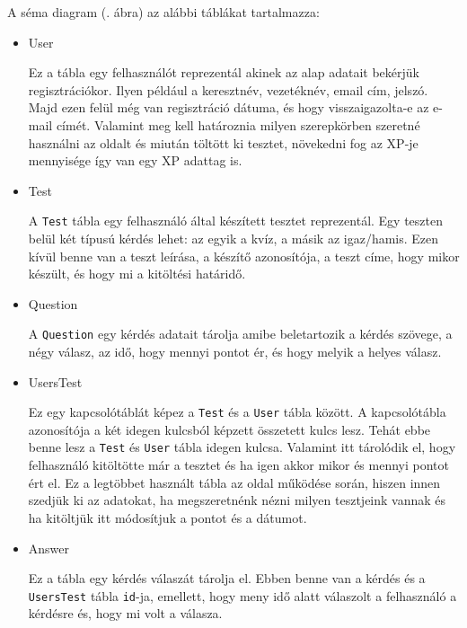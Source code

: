 A séma diagram (. ábra) az alábbi táblákat tartalmazza:
\begin{itemize}
    \item {User}
          \begin{addmargin}[\parindent]{0pt}
              Ez a tábla egy felhasználót reprezentál akinek az alap adatait bekérjük regisztrációkor. Ilyen például a keresztnév, vezetéknév, email cím, jelszó. Majd ezen felül még van regisztráció dátuma, és hogy visszaigazolta-e az e-mail címét. Valamint meg kell határoznia milyen szerepkörben szeretné használni az oldalt és miután töltött ki tesztet, növekedni fog az XP-je mennyisége így van egy XP adattag is.
          \end{addmargin}

    \item {Test}
          \begin{addmargin}[\parindent]{0pt}
              A \texttt{Test} tábla egy felhasználó által készített tesztet reprezentál. Egy teszten belül két típusú kérdés lehet: az egyik a kvíz, a másik az igaz/hamis. Ezen kívül benne van a teszt leírása, a készítő azonosítója, a teszt címe, hogy mikor készült, és hogy mi a kitöltési határidő.
          \end{addmargin}

    \item {Question}
          \begin{addmargin}[\parindent]{0pt}
              A \texttt{Question} egy kérdés adatait tárolja amibe beletartozik a kérdés szövege, a négy válasz, az idő, hogy mennyi pontot ér, és hogy melyik a helyes válasz.
          \end{addmargin}

    \item {UsersTest}
          \begin{addmargin}[\parindent]{0pt}
              Ez egy kapcsolótáblát képez a \texttt{Test} és a \texttt{User} tábla között. A kapcsolótábla azonosítója a két idegen kulcsból képzett összetett kulcs lesz. Tehát ebbe benne lesz a \texttt{Test} és \texttt{User} tábla idegen kulcsa. Valamint itt tárolódik el, hogy felhasználó kitöltötte már a tesztet és ha igen akkor mikor és mennyi pontot ért el. Ez a legtöbbet használt tábla az oldal működése során, hiszen innen szedjük ki az adatokat, ha megszeretnénk nézni milyen tesztjeink vannak és ha kitöltjük itt módosítjuk a pontot és a dátumot.
          \end{addmargin}

    \item {Answer}
          \begin{addmargin}[\parindent]{0pt}
              Ez a tábla egy kérdés válaszát tárolja el. Ebben benne van a kérdés és a \texttt{UsersTest} tábla \texttt{id}-ja, emellett, hogy meny idő alatt válaszolt a felhasználó a kérdésre és, hogy mi volt a válasza.
          \end{addmargin}
\end{itemize}

